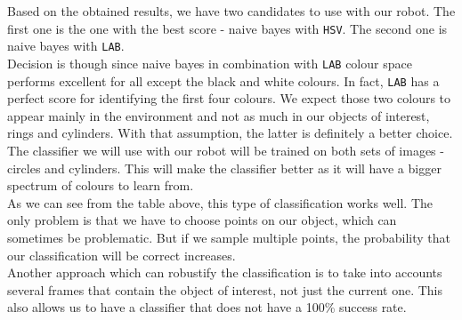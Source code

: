 \documentclass[12pt,a4paper]{article}
\begin{document}
	Based on the obtained results, we have two candidates to use with our robot. The first one is the one with the best score - naive bayes with \texttt{HSV}. The second one is naive bayes with \texttt{LAB}. \\ 
	
	Decision is though since naive bayes in combination with \texttt{LAB} colour space performs excellent for all except the black and white colours. In fact, \texttt{LAB} has a perfect score for identifying the first four colours. We expect those two colours to appear mainly in the environment and not as much in our objects of interest, rings and cylinders. With that assumption, the latter is definitely a better choice. \\

	The classifier we will use with our robot will be trained on both sets of images - circles and cylinders. This will make the classifier better as it will have a bigger spectrum of colours to learn from.\\
	
	As we can see from the table above, this type of classification works well. The only problem is that we have to choose points on our object, which can sometimes be problematic. But if we sample multiple points, the probability that our classification will be correct increases. \\

	Another approach which can robustify the classification is to take into accounts several frames that contain the object of interest, not just the current one. This also allows us to have a classifier that does not have a 100\% success rate.
\end{document}
